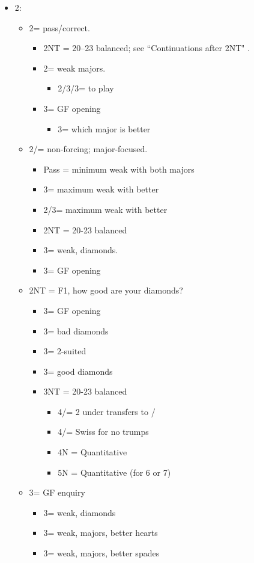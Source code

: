 \documentclass[a4paper,14pt]{extarticle}
\begin{document}
\begin{itemize}
\item 2\clubs:
	\begin{itemize}
   \item 2\diamonds = pass/correct.
		\begin{itemize}
      \item 2NT = 20--23 balanced; see ``Continuations after 2NT" .
      \item 2\hearts = weak majors.
			\begin{itemize}
			\item 2\spades/3\clubs/3\diamonds = to play
			\end{itemize}
		\item 3\clubs = GF opening
			\begin{itemize}
			\item 3\diamonds = which major is better
			\end{itemize}
		\end{itemize}
   \item 2\hearts/\spades = non-forcing; major-focused.
		\begin{itemize}
		\item Pass = minimum weak with both majors
		\item 3\hearts = maximum weak with better \hearts
		\item 2/3\spades = maximum weak with better \spades
		\item 2NT = 20-23 balanced
		\item 3\diamonds = weak, diamonds.
		\item 3\clubs = GF opening
		\end{itemize}
	\item 2NT = F1, how good are your diamonds?
		\begin{itemize}
		\item 3\clubs = GF opening
 		\item 3\diamonds = bad diamonds
		\item 3\hearts = 2-suited
		\item 3\spades = good diamonds
		\item 3NT = 20-23 balanced
			\begin{itemize}
         \item 4\clubs/\diamonds = 2 under transfers to \hearts/\spades
         \item 4\hearts/\spades = Swiss for no trumps 
         \item 4N = Quantitative
         \item 5N = Quantitative (for 6 or 7)
			\end{itemize}
		\end{itemize}
	\item 3\clubs = GF enquiry
		\begin{itemize}
		\item 3\diamonds = weak, diamonds
		\item 3\hearts = weak, majors, better hearts
		\item 3\spades = weak, majors, better spades
		\end{itemize}


\end{itemize}
\end{itemize}
\end{document}
